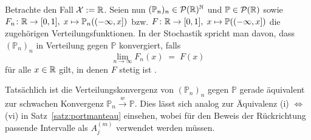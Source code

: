 \documentclass[../thesis/thesis.tex]{subfiles}
\begin{document}
	\begin{Bemerkung}[Verteilungskonvergenz]
		Betrachte den Fall $\mathcal{X} := \mathbb{R}$. Seien nun $(\mathbb{P}_n)_n \in \mathcal{P}(\mathbb{R})^{\mathbb{N}}$ und $\mathbb{P} \in \mathcal{P}(\mathbb{R})$ sowie $F_n \colon \mathbb{R} \to [0, 1], \; x \mapsto \mathbb{P}_n((-\infty, x]) $ bzw. $F \colon \mathbb{R} \to [0, 1], \; x \mapsto \mathbb{P}((-\infty, x]) $ die zugehörigen Verteilungsfunktionen. In der Stochastik spricht man davon, dass $(\mathbb{P}_n)_n$ in Verteilung gegen $\mathbb{P}$ konvergiert, falls 
		\[ \lim_{n \to \infty} F_n(x) \; = \; F(x) \]
		für alle $x \in \mathbb{R}$ gilt, in denen $F$ stetig ist \cite[Definition 6.1]{Henze.2016}. 
		
		Tatsächlich ist die Verteilungskonvergenz von $(\mathbb{P}_n)_n$ gegen $\mathbb{P}$ gerade äquivalent zur schwachen Konvergenz $\mathbb{P}_n \xrightarrow{w} \mathbb{P}$. Dies lässt sich analog zur Äquivalenz (i) $\Leftrightarrow$ (vi) in Satz~\ref{satz:portmanteau} einsehen, wobei für den Beweis der Rückrichtung passende Intervalle als $A_j^{(m)}$ verwendet werden müssen.
	\end{Bemerkung}
	
\end{document}
